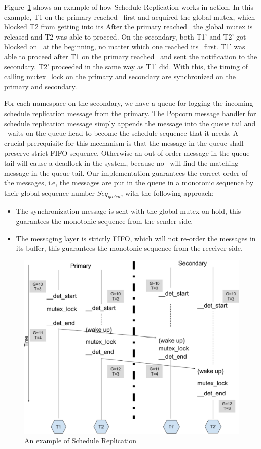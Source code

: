 Figure~\ref{f:scherep} shows an example of how Schedule Replication works in action. In this example, T1 on the primary reached \detstart\ first and acquired the global mutex, which blocked T2 from getting into its \detstart\. After the primary reached \detend\, the global mutex is released and T2 was able to proceed. On the secondary, both T1' and T2' got blocked on \detstart\ at the beginning, no matter which one reached its \detstart\ first. T1' was able to proceed after T1 on the primary reached \detend\ and sent the notification to the secondary. T2' proceeded in the same way as T1' did. With this, the timing of calling mutex\_lock on the primary and secondary are synchronized on the primary and secondary.

For each namespace on the secondary, we have a queue for logging the incoming schedule replication message from the primary. The Popcorn message handler for schedule replication message simply appends the message into the queue tail and \detstart\ waits on the queue head to become the schedule sequence that it needs. A crucial prerequisite for this mechanism is that the message in the queue shall preserve strict FIFO sequence. Otherwise an out-of-order message in the queue tail will cause a deadlock in the system, because no \detstart\ will find the matching message in the queue tail. Our implementation guarantees the correct order of the messages, i.e, the messages are put in the queue in a monotonic sequence by their global sequence number $Seq_{global}$, with the following approach:

\begin{itemize}
  \item The synchronization message is sent with the global mutex on hold, this guarantees the monotonic sequence from the sender side.
  \item The messaging layer is strictly FIFO, which will not re-order the messages in its buffer, this guarantees the monotonic sequence from the receiver side.
\end{itemize}

\begin{figure}
\centering
\includegraphics[width=0.9\columnwidth]{figures/sched_rep}
\caption{An example of Schedule Replication}
\label{f:scherep}
\end{figure}

